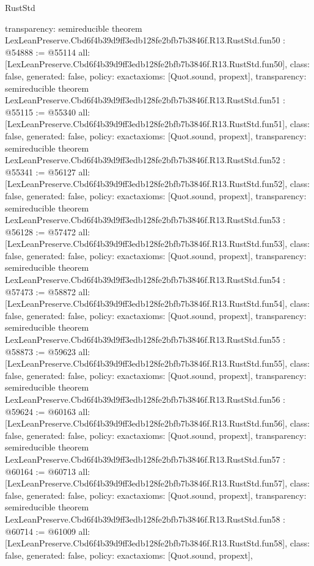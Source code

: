 \begin{lexlean}{RustStd}
\begin{coremodule}
{  transparency: semireducible
}
theorem LexLeanPreserve.Cbd6f4b39d9ff3edb128fe2bfb7b3846f.R13.RustStd.fun50 : @54888 := @55114 {
  all: [LexLeanPreserve.Cbd6f4b39d9ff3edb128fe2bfb7b3846f.R13.RustStd.fun50],
  class: false,
  generated: false,
  policy: exact{axioms: [Quot.sound, propext]},
  transparency: semireducible
}
theorem LexLeanPreserve.Cbd6f4b39d9ff3edb128fe2bfb7b3846f.R13.RustStd.fun51 : @55115 := @55340 {
  all: [LexLeanPreserve.Cbd6f4b39d9ff3edb128fe2bfb7b3846f.R13.RustStd.fun51],
  class: false,
  generated: false,
  policy: exact{axioms: [Quot.sound, propext]},
  transparency: semireducible
}
theorem LexLeanPreserve.Cbd6f4b39d9ff3edb128fe2bfb7b3846f.R13.RustStd.fun52 : @55341 := @56127 {
  all: [LexLeanPreserve.Cbd6f4b39d9ff3edb128fe2bfb7b3846f.R13.RustStd.fun52],
  class: false,
  generated: false,
  policy: exact{axioms: [Quot.sound, propext]},
  transparency: semireducible
}
theorem LexLeanPreserve.Cbd6f4b39d9ff3edb128fe2bfb7b3846f.R13.RustStd.fun53 : @56128 := @57472 {
  all: [LexLeanPreserve.Cbd6f4b39d9ff3edb128fe2bfb7b3846f.R13.RustStd.fun53],
  class: false,
  generated: false,
  policy: exact{axioms: [Quot.sound, propext]},
  transparency: semireducible
}
theorem LexLeanPreserve.Cbd6f4b39d9ff3edb128fe2bfb7b3846f.R13.RustStd.fun54 : @57473 := @58872 {
  all: [LexLeanPreserve.Cbd6f4b39d9ff3edb128fe2bfb7b3846f.R13.RustStd.fun54],
  class: false,
  generated: false,
  policy: exact{axioms: [Quot.sound, propext]},
  transparency: semireducible
}
theorem LexLeanPreserve.Cbd6f4b39d9ff3edb128fe2bfb7b3846f.R13.RustStd.fun55 : @58873 := @59623 {
  all: [LexLeanPreserve.Cbd6f4b39d9ff3edb128fe2bfb7b3846f.R13.RustStd.fun55],
  class: false,
  generated: false,
  policy: exact{axioms: [Quot.sound, propext]},
  transparency: semireducible
}
theorem LexLeanPreserve.Cbd6f4b39d9ff3edb128fe2bfb7b3846f.R13.RustStd.fun56 : @59624 := @60163 {
  all: [LexLeanPreserve.Cbd6f4b39d9ff3edb128fe2bfb7b3846f.R13.RustStd.fun56],
  class: false,
  generated: false,
  policy: exact{axioms: [Quot.sound, propext]},
  transparency: semireducible
}
theorem LexLeanPreserve.Cbd6f4b39d9ff3edb128fe2bfb7b3846f.R13.RustStd.fun57 : @60164 := @60713 {
  all: [LexLeanPreserve.Cbd6f4b39d9ff3edb128fe2bfb7b3846f.R13.RustStd.fun57],
  class: false,
  generated: false,
  policy: exact{axioms: [Quot.sound, propext]},
  transparency: semireducible
}
theorem LexLeanPreserve.Cbd6f4b39d9ff3edb128fe2bfb7b3846f.R13.RustStd.fun58 : @60714 := @61009 {
  all: [LexLeanPreserve.Cbd6f4b39d9ff3edb128fe2bfb7b3846f.R13.RustStd.fun58],
  class: false,
  generated: false,
  policy: exact{axioms: [Quot.sound, propext]},
}
\end{coremodule}
\end{lexlean}
